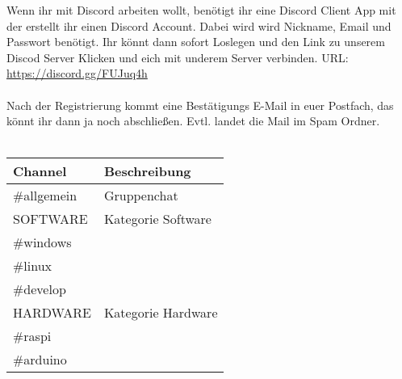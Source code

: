 Wenn ihr mit Discord arbeiten wollt, benötigt ihr eine Discord Client App mit der erstellt ihr einen Discord Account. Dabei wird wird Nickname, Email und Passwort benötigt. Ihr könnt dann sofort Loslegen und den Link zu unserem Discod Server Klicken und eich mit underem Server verbinden. URL: \url{https://discord.gg/FUJuq4h}\\
\ \\
Nach der Registrierung kommt eine Bestätigungs E-Mail in euer Postfach, das könnt ihr dann ja noch abschließen. Evtl. landet die Mail im Spam Ordner.   \\

\ \\
\begin{raggedright}
\begin{tabular}{|p{}|p{}|}
\hline
\textbf{Channel} & \textbf{Beschreibung}\\
\hline
\#allgemein & Gruppenchat\\
\hline
SOFTWARE & Kategorie Software\\
\cline{1-1}
\#windows & \\
\cline{1-1}
\#linux & \\
\cline{1-1}
\#develop & \\
\hline
HARDWARE & Kategorie Hardware\\
\cline{1-1}
\#raspi & \\
\cline{1-1}
\#arduino & \\
\hline
\end{tabular}
\label{tab:Channels}
\end{raggedright}


